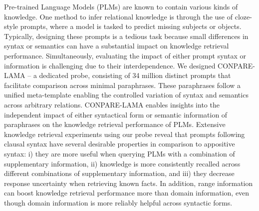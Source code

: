 Pre-trained Language Models (PLMs) are known to contain various kinds of knowledge. One method to infer relational knowledge is through the use of cloze-style prompts, where a model is tasked to predict missing subjects or objects.  Typically, designing these prompts is a tedious task because small differences in syntax or semantics can have a substantial impact on knowledge retrieval performance.  Simultaneously, evaluating the impact of either prompt syntax or information is challenging due to their interdependence.  We designed CONPARE-LAMA – a dedicated probe, consisting of 34 million distinct prompts that facilitate comparison across minimal paraphrases.  These paraphrases follow a unified meta-template enabling the controlled variation of syntax and semantics across arbitrary relations. CONPARE-LAMA enables insights into the independent impact of either syntactical form or semantic information of paraphrases on the knowledge retrieval performance of PLMs. Extensive knowledge retrieval experiments using our probe reveal that prompts following clausal syntax have several desirable properties in comparison to appositive syntax:  i) they are more useful when querying PLMs with a combination of supplementary information,  ii) knowledge is more consistently recalled across different combinations of supplementary information, and  iii) they decrease response uncertainty when retrieving known facts. In addition, range information can boost knowledge retrieval performance more than domain information, even though domain information is more reliably helpful across syntactic forms.
